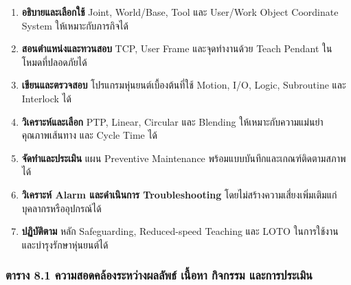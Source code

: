 \begin{enumerate}
    \item \textbf{อธิบายและเลือกใช้} Joint, World/Base, Tool และ User/Work Object Coordinate System ให้เหมาะกับภารกิจได้
    \item \textbf{สอนตำแหน่งและทวนสอบ} TCP, User Frame และจุดทำงานด้วย Teach Pendant ในโหมดที่ปลอดภัยได้
    \item \textbf{เขียนและตรวจสอบ} โปรแกรมหุ่นยนต์เบื้องต้นที่ใช้ Motion, I/O, Logic, Subroutine และ Interlock ได้
    \item \textbf{วิเคราะห์และเลือก} PTP, Linear, Circular และ Blending ให้เหมาะกับความแม่นยำ คุณภาพเส้นทาง และ Cycle Time ได้
    \item \textbf{จัดทำและประเมิน} แผน Preventive Maintenance พร้อมแบบบันทึกและเกณฑ์ติดตามสภาพได้
    \item \textbf{วิเคราะห์ Alarm และดำเนินการ Troubleshooting} โดยไม่สร้างความเสี่ยงเพิ่มเติมแก่บุคลากรหรืออุปกรณ์ได้
    \item \textbf{ปฏิบัติตาม} หลัก Safeguarding, Reduced-speed Teaching และ LOTO ในการใช้งานและบำรุงรักษาหุ่นยนต์ได้
\end{enumerate}

\subsubsection{ตาราง 8.1 ความสอดคล้องระหว่างผลลัพธ์ เนื้อหา กิจกรรม และการประเมิน}


\newpage

